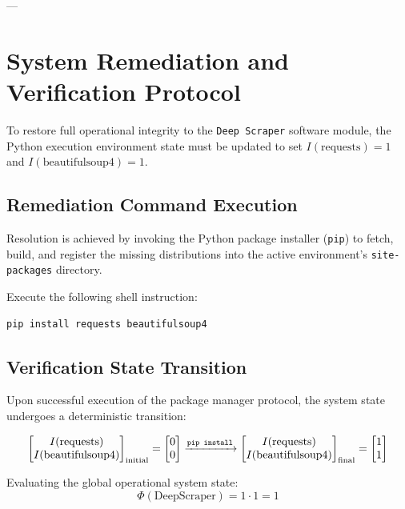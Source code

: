 \documentclass{article}
\begin{document}
---

\section{System Remediation and Verification Protocol}

To restore full operational integrity to the \texttt{Deep Scraper} software module, the Python execution environment state must be updated to set $I(\text{requests}) = 1$ and $I(\text{beautifulsoup4}) = 1$.

\subsection{Remediation Command Execution}
Resolution is achieved by invoking the Python package installer (\texttt{pip}) to fetch, build, and register the missing distributions into the active environment's \texttt{site-packages} directory.

Execute the following shell instruction:

\begin{verbatim}
pip install requests beautifulsoup4
\end{verbatim}

\subsection{Verification State Transition}
Upon successful execution of the package manager protocol, the system state undergoes a deterministic transition:

\begin{equation}
\begin{bmatrix}
I(\text{requests}) \\
I(\text{beautifulsoup4})
\end{bmatrix}_{\text{initial}} 
= 
\begin{bmatrix}
0 \\
0
\end{bmatrix}
\xrightarrow{\text{\texttt{pip install}}}
\begin{bmatrix}
I(\text{requests}) \\
I(\text{beautifulsoup4})
\end{bmatrix}_{\text{final}} 
= 
\begin{bmatrix}
1 \\
1
\end{bmatrix}
\end{equation}

Evaluating the global operational system state:
\begin{equation}
\Phi(\text{DeepScraper}) = 1 \cdot 1 = 1
\end{equation}
\end{document}
